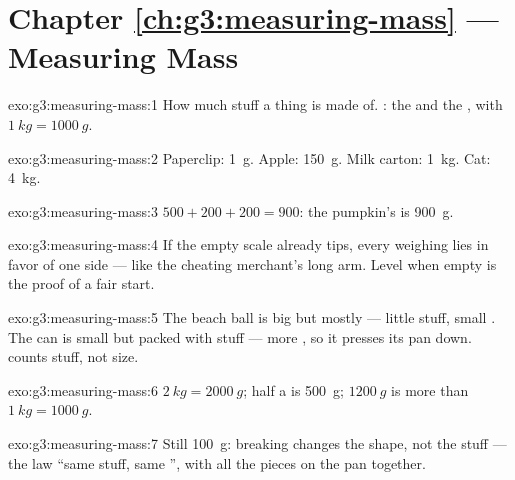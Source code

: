 \section*{Chapter \ref{ch:g3:measuring-mass} --- Measuring Mass}

\begin{solution}{exo:g3:measuring-mass:1}
How much stuff a thing is made of. : the  and the
, with $\qty{1}{kg} = \qty{1000}{g}$.
\end{solution}

\begin{solution}{exo:g3:measuring-mass:2}
Paperclip: \qty{1}{g}. Apple: \qty{150}{g}. Milk carton:
\qty{1}{kg}. Cat: \qty{4}{kg}.
\end{solution}

\begin{solution}{exo:g3:measuring-mass:3}
$500 + 200 + 200 = 900$: the pumpkin's  is \qty{900}{g}.
\end{solution}

\begin{solution}{exo:g3:measuring-mass:4}
If the empty scale already tips, every weighing lies in favor of
one side --- like the cheating merchant's long arm. Level when
empty is the proof of a fair start.
\end{solution}

\begin{solution}{exo:g3:measuring-mass:5}
The beach ball is big but mostly  --- little stuff, small .
The can is small but packed with stuff --- more , so it presses
its pan down.  counts stuff, not size.
\end{solution}

\begin{solution}{exo:g3:measuring-mass:6}
$\qty{2}{kg} = \qty{2000}{g}$; half a  is \qty{500}{g};
$\qty{1200}{g}$ is more than $\qty{1}{kg} = \qty{1000}{g}$.
\end{solution}

\begin{solution}{exo:g3:measuring-mass:7}
Still \qty{100}{g}: breaking changes the shape, not the stuff ---
the law ``same stuff, same '', with all the pieces on the pan
together.
\end{solution}

